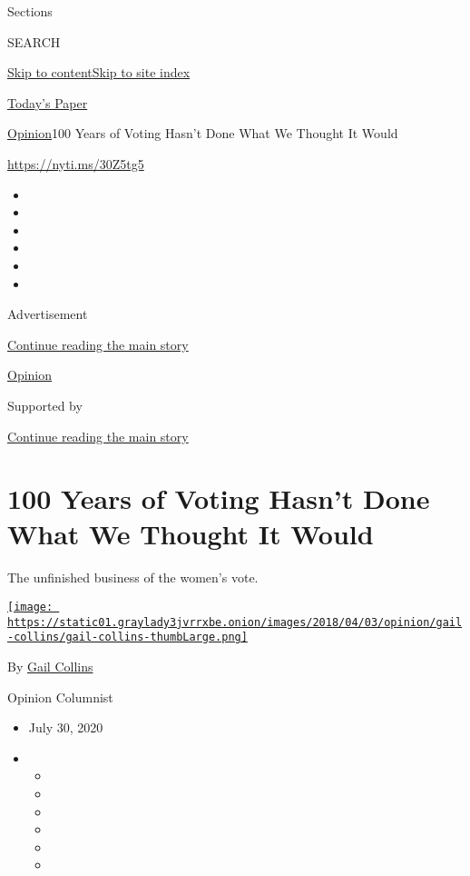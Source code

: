 Sections

SEARCH

\protect\hyperlink{site-content}{Skip to
content}\protect\hyperlink{site-index}{Skip to site index}

\href{https://myaccount.nytimes3xbfgragh.onion/auth/login?response_type=cookie\&client_id=vi}{}

\href{https://www.nytimes3xbfgragh.onion/section/todayspaper}{Today's
Paper}

\href{/section/opinion}{Opinion}\textbar{}100 Years of Voting Hasn't
Done What We Thought It Would

\url{https://nyti.ms/30Z5tg5}

\begin{itemize}
\item
\item
\item
\item
\item
\item
\end{itemize}

Advertisement

\protect\hyperlink{after-top}{Continue reading the main story}

\href{/section/opinion}{Opinion}

Supported by

\protect\hyperlink{after-sponsor}{Continue reading the main story}

\hypertarget{100-years-of-voting-hasnt-done-what-we-thought-it-would}{%
\section{100 Years of Voting Hasn't Done What We Thought It
Would}\label{100-years-of-voting-hasnt-done-what-we-thought-it-would}}

The unfinished business of the women's vote.

\href{https://www.nytimes3xbfgragh.onion/by/gail-collins}{\texttt{[image: https://static01.graylady3jvrrxbe.onion/images/2018/04/03/opinion/gail-collins/gail-collins-thumbLarge.png]}}

By \href{https://www.nytimes3xbfgragh.onion/by/gail-collins}{Gail
Collins}

Opinion Columnist

\begin{itemize}
\item
  July 30, 2020
\item
  \begin{itemize}
  \item
  \item
  \item
  \item
  \item
  \item
  \end{itemize}
\end{itemize}

